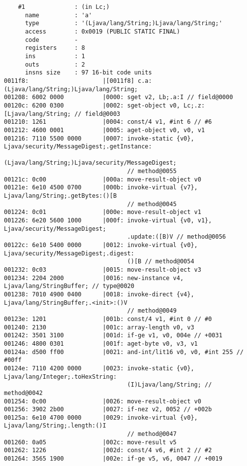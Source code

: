 \begin{lstlisting}
    #1              : (in Lc;)
      name          : 'a'
      type          : '(Ljava/lang/String;)Ljava/lang/String;'
      access        : 0x0019 (PUBLIC STATIC FINAL)
      code          -
      registers     : 8
      ins           : 1
      outs          : 2
      insns size    : 97 16-bit code units
0011f8:                     |[0011f8] c.a:(Ljava/lang/String;)Ljava/lang/String;
001208: 6002 0000           |0000: sget v2, Lb;.a:I // field@0000
00120c: 6200 0300           |0002: sget-object v0, Lc;.z:[Ljava/lang/String; // field@0003
001210: 1261                |0004: const/4 v1, #int 6 // #6
001212: 4600 0001           |0005: aget-object v0, v0, v1
001216: 7110 5500 0000      |0007: invoke-static {v0}, Ljava/security/MessageDigest;.getInstance:
                                   (Ljava/lang/String;)Ljava/security/MessageDigest;
                                   // method@0055
00121c: 0c00                |000a: move-result-object v0
00121e: 6e10 4500 0700      |000b: invoke-virtual {v7}, Ljava/lang/String;.getBytes:()[B
                                   // method@0045
001224: 0c01                |000e: move-result-object v1
001226: 6e20 5600 1000      |000f: invoke-virtual {v0, v1}, Ljava/security/MessageDigest;
                                   .update:([B)V // method@0056
00122c: 6e10 5400 0000      |0012: invoke-virtual {v0}, Ljava/security/MessageDigest;.digest:
                                   ()[B // method@0054
001232: 0c03                |0015: move-result-object v3
001234: 2204 2000           |0016: new-instance v4, Ljava/lang/StringBuffer; // type@0020
001238: 7010 4900 0400      |0018: invoke-direct {v4}, Ljava/lang/StringBuffer;.<init>:()V
                                   // method@0049
00123e: 1201                |001b: const/4 v1, #int 0 // #0
001240: 2130                |001c: array-length v0, v3
001242: 3501 3100           |001d: if-ge v1, v0, 004e // +0031
001246: 4800 0301           |001f: aget-byte v0, v3, v1
00124a: d500 ff00           |0021: and-int/lit16 v0, v0, #int 255 // #00ff
00124e: 7110 4200 0000      |0023: invoke-static {v0}, Ljava/lang/Integer;.toHexString:
                                   (I)Ljava/lang/String; // method@0042
001254: 0c00                |0026: move-result-object v0
001256: 3902 2b00           |0027: if-nez v2, 0052 // +002b
00125a: 6e10 4700 0000      |0029: invoke-virtual {v0}, Ljava/lang/String;.length:()I
                                   // method@0047
001260: 0a05                |002c: move-result v5
001262: 1226                |002d: const/4 v6, #int 2 // #2
001264: 3565 1900           |002e: if-ge v5, v6, 0047 // +0019

\end{lstlisting}
